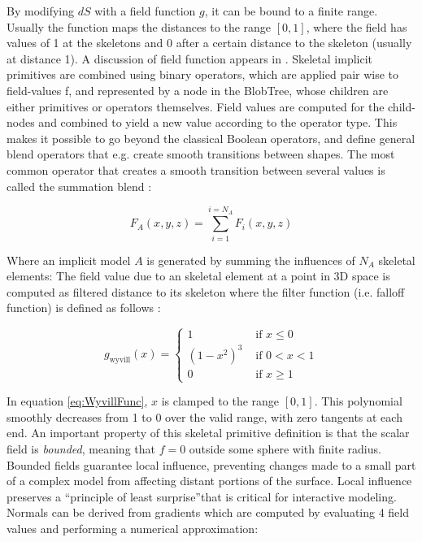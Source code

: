 By modifying $dS$ with a field function $g$, it can be bound to a finite range. Usually the function maps the distances to the range $[0, 1]$, 
where the field has values of 1 at the skeletons and 0 after a certain distance to the skeleton (usually at distance 1). A discussion of field 
function appears in \cite{shirley2009graphics}. Skeletal implicit primitives are combined using binary operators, which are applied pair wise to 
field-values f, and represented by a node in the BlobTree, whose children are either primitives or operators themselves.
Field values are computed for the child-nodes and combined to yield a new value according to the operator type. This makes it possible to go beyond 
the classical Boolean operators, and define general blend operators that e.g. create smooth transitions between shapes. The most common operator 
that creates a smooth transition between several values is called the summation blend \cite{Bloomenthal1997}:

\begin{equation}
F_A(x, y, z)=\sum_{i=1}^{i=N_A}F_i(x, y, z)
\end{equation}

Where an implicit model $A$ is generated by summing the influences of $N_A$ skeletal elements: 
The field value due to an skeletal element at a point in 3D space is computed as filtered distance to its skeleton 
where the filter function (i.e. falloff function) is defined as follows \cite{Wyvill1999}: 

\begin{equation}
g_\mathrm{wyvill}(x)= \left\{ \begin{array}{rl}
 1 &\mbox{ if $x\leq0$} \\
 (1-x^2)^3 &\mbox{ if $0<x<1$}\\
  0 &\mbox{ if $x\geq1$}  
  \end{array} \right.
\label{eq:WyvillFunc}
\end{equation}

In equation \ref{eq:WyvillFunc}, $x$ is clamped to the range $[0,1]$. This polynomial smoothly decreases from 1 to 0 over the valid range, with zero
tangents at each end. An important property of this skeletal primitive definition is that the scalar field is \textit{bounded}, meaning that $f=0$
outside some sphere with finite radius. Bounded fields guarantee local influence, preventing changes made to a small part of a complex model from
affecting distant portions of the surface. Local influence preserves a \textquotedblleft principle of least surprise\textquotedblright that is critical for interactive modeling.  
Normals can be derived from gradients which are computed by evaluating 4 field values and performing a numerical approximation:

